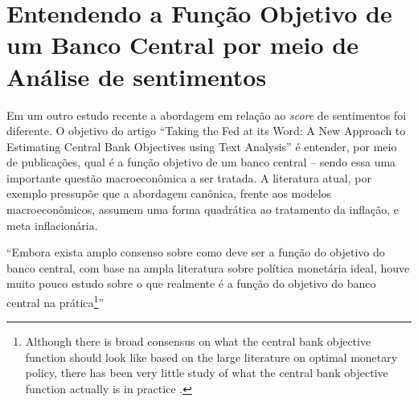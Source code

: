 


\section{Entendendo a Função Objetivo de um Banco Central por meio de Análise de sentimentos}

Em um outro estudo recente a abordagem em relação ao \textit{score} de sentimentos foi diferente. O objetivo do artigo ``Taking the Fed at its Word: A New Approach to Estimating Central Bank Objectives using Text Analysis'' \cite{shapiro2019taking} é entender, por meio de publicações, qual é a função objetivo de um banco central -- sendo essa uma importante questão macroeconômica a ser tratada. A literatura atual, por exemplo  pressupõe que a abordagem canônica, frente aos modelos macroeconômicos, assumem uma forma quadrática ao tratamento da inflação, e meta inflacionária. 

\begin{citacao}
``Embora exista amplo consenso sobre como deve ser a função do objetivo do banco central, com base na ampla literatura sobre política monetária ideal, houve muito pouco estudo sobre o que realmente é a função do objetivo do banco central na prática\footnote{Although there is broad consensus on what the central bank objective function should look like based on the large literature on optimal monetary policy, there has been very little study of what the central bank objective function actually is in practice \cite[p.2]{shapiro2019taking}.}'' \cite[p.2]{shapiro2019taking}
\end{citacao}

